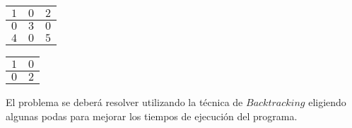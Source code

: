 \documentclass[11pt, a4paper, twoside]{article}
\begin{document}
\begin{itemize}
	\begin{center}
      \begin{minipage}{0.2\textwidth}
          \begin{tabular}{|c|c|c|}
              \hline
               $1$ & $0$ & $2$ \\
              \hline
               $0$ & $3$ & $0$  \\
              \hline 
               $4$ & $0$ & $5$ \\
              \hline
          \end{tabular}
      \end{minipage}
      \begin{minipage}{0.2\textwidth}
          \begin{tabular}{|c|c|}
              \hline
               $1$ & $0$ \\
              \hline
               $0$ & $2$ \\
              \hline
          \end{tabular}
      \end{minipage}
	\end{center}
	\end{itemize} 


\begin{center} 

El problema se deberá resolver utilizando la técnica de $Backtracking$ eligiendo
algunas podas para mejorar los tiempos de ejecución del programa.

\end{center}
\end{document}
